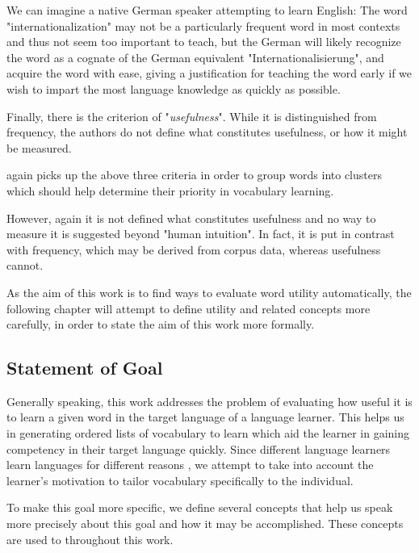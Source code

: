 We can imagine a native German speaker attempting to learn English:
The word "internationalization" may not be a particularly frequent word in most contexts and thus not seem too important to teach, but the German will likely recognize the word as a cognate of the German equivalent "Internationalisierung", and acquire the word with ease, giving a justification for teaching the word early if we wish to impart the most language knowledge as quickly as possible.

Finally, there is the criterion of "\textit{usefulness}".
While it is distinguished from frequency, the authors do not define what constitutes usefulness, or how it might be measured.

 again picks up the above three criteria in order to group words into clusters which should help determine their priority in vocabulary learning.

However, again it is not defined what constitutes usefulness and no way to measure it is suggested beyond "human intuition".
In fact, it is put in contrast with frequency, which may be derived from corpus data, whereas usefulness cannot.

As the aim of this work is to find ways to evaluate word utility automatically, the following chapter will attempt to define utility and related concepts more carefully, in order to state the aim of this work more formally.

\subsection{Statement of Goal} \label{sec:statement-of-goal}

Generally speaking, this work addresses the problem of evaluating how useful it is to learn a given word in the target language of a language learner.
This helps us in generating ordered lists of vocabulary to learn which aid the learner in gaining competency in their target language quickly.
Since different language learners learn languages for different reasons , we attempt to take into account the learner's motivation to tailor vocabulary specifically to the individual.

To make this goal more specific, we define several concepts that help us speak more precisely about this goal and how it may be accomplished.
These concepts are used to throughout this work.

